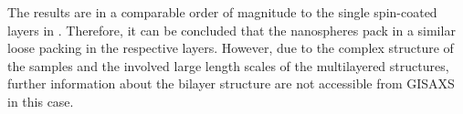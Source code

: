 \documentclass[\main/dresen_thesis.tex]{subfiles}
\begin{document}
  The results are in a comparable order of magnitude to the single spin-coated layers in .
  Therefore, it can be concluded that the nanospheres pack in a similar loose packing in the respective layers.
  However, due to the complex structure of the samples and the involved large length scales of the multilayered structures, further information about the bilayer structure are not accessible from GISAXS in this case.
\end{document}
